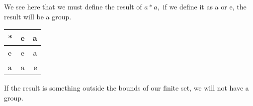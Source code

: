 We see here that we must define the result of $a*a,$ if we define it as a or e, the result will be a group.

\begin{center}
\begin{tabular} {| l || c | r |}
  \hline
  * & e & a \\ \hline \hline
  e & e & a \\ \hline
  a & a & e \\ \hline

\end{tabular}
\end{center}

If the result is something outside the bounds of our finite set, we will not have a group.
